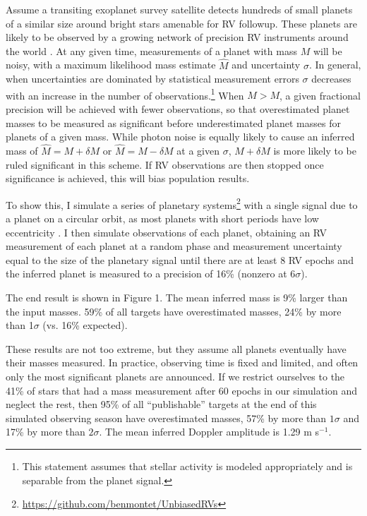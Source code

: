 \documentclass[rnaas]{aastex62}
\begin{document}
Assume a transiting exoplanet survey satellite detects hundreds of small
planets of a similar size around bright stars amenable for RV followup.
These planets are likely to be observed by a growing network of precision 
RV instruments around the world \citep{Wright17}. 
At any given time, measurements of a planet with mass $M$ will be noisy, with a maximum likelihood mass estimate $\hat{M}$ and uncertainty $\sigma$.
In general,
when uncertainties are dominated by statistical measurement errors $\sigma$ 
decreases with an increase in the number of observations.\footnote{This statement assumes that stellar activity is modeled appropriately
and is separable from the planet signal.} When $\hat{M} > M$, a given fractional
precision will be achieved with fewer observations, so that overestimated planet masses to be measured as significant before underestimated planet masses for planets of a given mass. While photon noise is equally likely to cause an inferred mass of $\hat{M} = M + \delta M$ or $\hat{M} = M - \delta M$ at a given $\sigma$, $M + \delta M$ is more likely to be ruled significant in this scheme. If RV observations are then stopped once significance is
achieved, this will bias population results.

To show this, I simulate a series of planetary systems\footnote{\url{https://github.com/benmontet/UnbiasedRVs}} with a single signal due to a planet
on a circular orbit, as most planets with short periods have low eccentricity \citep{Shabram16}. I then simulate observations of each planet, obtaining an RV measurement of each planet at a random phase and measurement uncertainty equal to the size of the planetary signal until there are at least 8 RV epochs
and the inferred planet is measured to a precision of 16\% (nonzero at $6\sigma$). 


The end result is shown in Figure 1. The mean inferred mass is 9\% larger than
the input masses. 59\% of all targets have overestimated masses, 24\% by more 
than 1$\sigma$ (vs. 16\% expected). 

These results are not too extreme, but they assume all planets eventually have their masses measured. In practice, observing time is fixed and limited, and often only the most significant planets are announced. 
If we restrict ourselves to the 41\% of stars that had a mass measurement
after 60 epochs in our simulation and neglect the rest, then 95\% of all ``publishable'' targets at the end of this simulated observing season have overestimated masses, 57\% by more than $1\sigma$
and 17\% by more than $2\sigma$. The mean inferred Doppler amplitude is 1.29 m s$^{-1}$.
\end{document}
